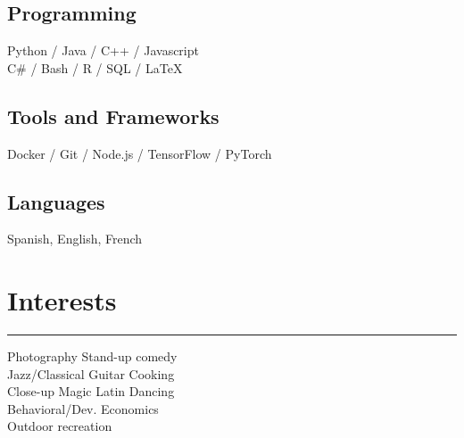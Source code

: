 \documentclass[]{dafirebanks-resume-openfont}
\begin{document}
\begin{minipage}[t]{0.33\textwidth}
\subsection{Programming}
Python / Java / C++ / Javascript \\
C\# / Bash / R / SQL / \LaTeX

\sectionsep 
\subsection{Tools and Frameworks}
Docker / Git / Node.js / TensorFlow / PyTorch
\sectionsep
\subsection{Languages}
Spanish, English, French %
\sectionsep 




\section{Interests}
\vspace{-3pt}
{\color{blue}\hrule width 78pt \vspace{5pt}}
Photography \textbullet{} Stand-up comedy \\   
\textbullet{} Jazz/Classical Guitar \textbullet{} Cooking\\ 
Close-up Magic \textbullet{} Latin Dancing \\
\textbullet{} Behavioral/Dev. Economics\\  
 Outdoor recreation


\end{minipage}
\end{document}
